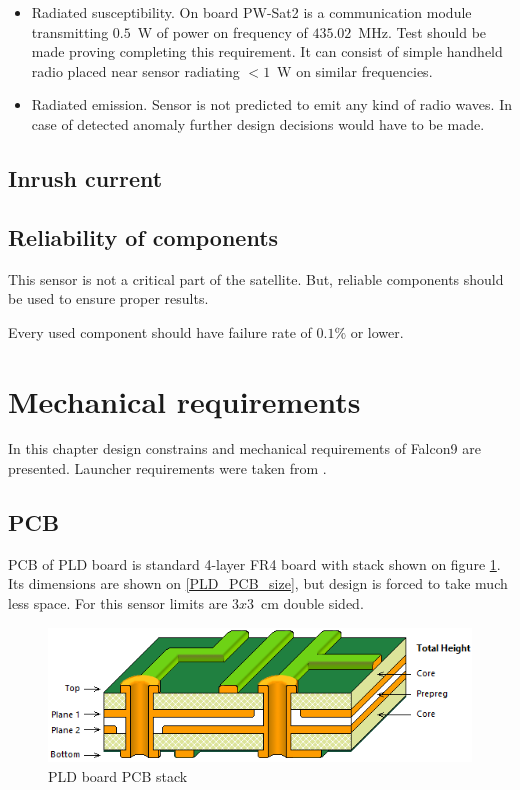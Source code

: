 \begin{itemize}
		\item Radiated susceptibility.
			On board PW-Sat2 is a communication module transmitting $0.5$~W of power on frequency of $435.02$~MHz. Test should be made proving completing this requirement. It can consist of simple handheld radio placed near sensor radiating $< 1$~W on similar frequencies.
			
		\item Radiated emission.
			Sensor is not predicted to emit any kind of radio waves. In case of detected anomaly further design decisions would have to be made.
		
	\end{itemize}


\subsection{Inrush current}

\subsection{Reliability of components}
	This sensor is not a critical part of the satellite. But, reliable components should be used to ensure proper results. 
	
	Every used component should have failure rate of $0.1\%$ or lower.


\section{Mechanical requirements}
	In this chapter design constrains and mechanical requirements of Falcon9 are presented. Launcher requirements were taken from \cite{Falcon9_user_manual}.
	
\subsection{PCB}
\label{PCB_description}
	PCB of PLD board is standard 4-layer FR4 board with stack shown on figure \ref{PLD_PCB_stack}. Its dimensions are shown on \ref{PLD_PCB_size}, but design is forced to take much less space. For this sensor limits are $3x3$~cm double sided.

	\begin{figure}[H]
		\centering
		\includegraphics[width=0.5\paperwidth]{img/PLD_PCB_stack.png}
		\caption{PLD board PCB stack}
		\label{PLD_PCB_stack}
	\end{figure}	

